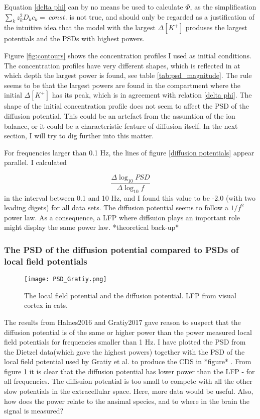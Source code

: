 \documentclass{article}
\begin{document}
Equation \ref{delta phi} can by no means be used to calculate $\Phi$, as the simplification $\sum_k z_k^2 D_k c_k =\ const.$ is not true, and should only be regarded as a justification of the intuitive idea that the model with the largest $\Delta [K^+]$ produses the largest potentials and the PSDs with highest powers. 


Figure \ref{fig:contours} shows the concentration profiles I used as initial conditions. The concentration profiles have very different shapes, which is reflected in at which depth the largest power is found, see table \ref{tab:psd_magnitude}. The rule seems to be that the largest powers are found in the compartment where the initial $\Delta [K^+]$ has its peak, which is in agreement with relation \ref{delta phi}. The shape of the initial concentration profile does not seem to affect the PSD of the diffusion potential. This could be an artefact from the assumtion of the ion balance, or it could be a characteristic feature of diffusion itself. In the next section, I will try to dig further into this matter. 


For frequencies larger than 0.1 Hz, the lines of figure \ref{diffusion potentials} appear  parallel. I calculated 

$$\frac{\Delta\log_{10}PSD}{\Delta \log_{10}f}$$
in the interval between 0.1 and 10 Hz, and I found this value to be -2.0 (with two leading digets) for all data sets. The diffusion potential seems to follow a $1/f^2$ power law. As a consequence, a LFP where diffsuion plays an important role might display the same power law.  *theoretical back-up*







\subsubsection{The PSD of the diffusion potential compared to PSDs of local field potentials}

\begin{figure}
  \texttt{[image: PSD\_Gratiy.png]}
  \caption{The local field potential and the diffusion potential. LFP from visual cortex in cats.}
  \label{fig:PSD_Gratiy}
\end{figure}

The results from Halnes2016 and Gratiy2017 gave reason to suspect that the diffusion potential is of the same or higher power than the power measured local field potentials for frequencies smaller than 1 Hz. I have plotted the PSD from the Dietzel data(which gave the highest powers) together with the PSD of the local field potential used by Gratiy et al. to produce the CDS in *figure* . From figure \ref{fig:PSD_Gratiy} it is clear that the diffusion potential has lower power than the LFP  - for all frequencies. The diffsuion potential is too small to compete with all the other slow potentials in the extracellular space. Here, more data would be useful. Also, how does the power relate to the ansimal species, and to where in the brain the signal is measured?
\end{document}
